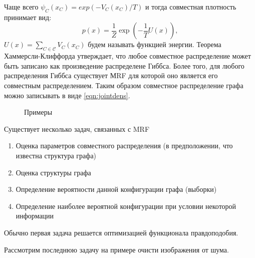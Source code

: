\documentclass[12pt]{article}
\begin{document}
Чаще всего $\psi_C(x_C) = exp(-V_C(x_C)/T)$ и тогда совместная плотность принимает вид:
\begin{equation}
p(x) = \frac{1}{Z} \exp\left(-\frac{1}{T} U(x)\right),   
\end{equation}
$U(x) = \sum_{C \in \mathcal{C}}V_C(x_C)$ будем называть функцией энергии.
Теорема  Хаммерсли-Клиффорда утверждает, что любое совместное распределение может быть записано как произведение распределене Гиббса. Более того, для любого распределения Гиббса существует МRF для которой оно является его совместным распределением. Таким образом совместное распределение графа можно записывать в виде \eqref{eqn:jointdens}.


\begin{figure}[hhh]
\centering
{}
\label{fig:mrf}
\caption{Примеры}
\end{figure}

Существует несколько задач, связанных с MRF 
\begin{enumerate}
\item Оценка параметров совместного распределения (в предположении, что известна структура графа)
\item Оценка структуры графа
\item Определение вероятности данной конфигурации графа (выборки)
\item Определение наиболее вероятной конфигурации при условии некоторой информации
\end{enumerate}
Обычно первая задача решается оптимизацией функционала правдоподобия.

Рассмотрим последнюю задачу на примере очисти изображения от шума.
\end{document}
